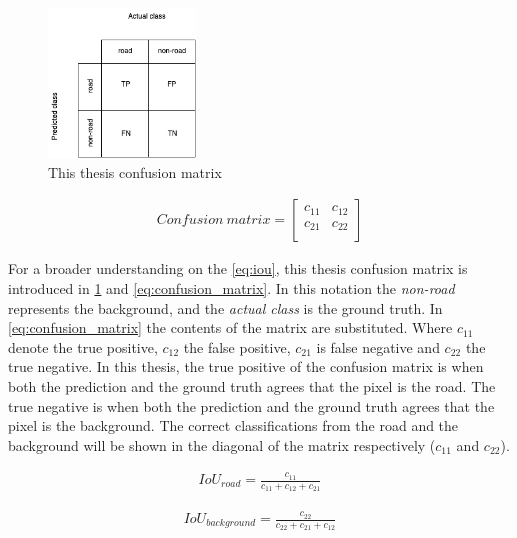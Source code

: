 \documentclass[USenglish]{ifimaster}  %
\begin{document}
\begin{figure}[ht]
    \centering
    \includegraphics[width=0.35\textwidth]{bilder/confusion_matrix.png}
    \caption{This thesis confusion matrix}
    \label{fig:confusion_matrix}
\end{figure}


\begin{equation}\label{eq:confusion_matrix}
\begin{aligned}
Confusion\:matrix =
\begin{bmatrix} 
   c_{11} & c_{12} \\
   c_{21} & c_{22} \\
\end{bmatrix} 
\end{aligned}
\end{equation}

For a broader understanding on the \cref{eq:iou}, this thesis confusion matrix is introduced in \cref{fig:confusion_matrix} and \cref{eq:confusion_matrix}. In this notation the \textit{non-road} represents the background, and the \textit{actual class} is the ground truth. In \cref{eq:confusion_matrix} the contents of the matrix are substituted. Where $c_{11}$ denote the true positive, $c_{12}$ the false positive, $c_{21}$ is false negative and $c_{22}$ the true negative. In this thesis, the true positive of the confusion matrix is when both the prediction and the ground truth agrees that the pixel is the road. The true negative is when both the prediction and the ground truth agrees that the pixel is the background. The correct classifications from the road and the background will be shown in the diagonal of the matrix respectively ($c_{11}$ and $c_{22}$).

\begin{equation}\label{eq:iou_1}
\begin{aligned}
IoU_{road} = \frac{c_{11}}{c_{11} + c_{12} + c_{21}}
\end{aligned}
\end{equation}

\begin{equation}\label{eq:iou_2}
\begin{aligned}
IoU_{background} = \frac{c_{22}}{c_{22} + c_{21} + c_{12}}
\end{aligned}
\end{equation}
\end{document}

